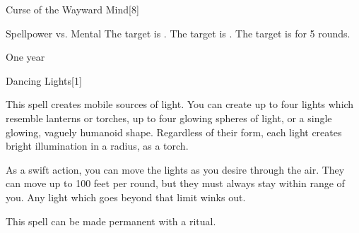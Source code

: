 \begin{spellsection}{Curse of the Wayward Mind}[8]
    \begin{spellheader}
    \end{spellheader}
    \begin{spellcontent}
        \begin{spelltargetinginfo}
        \end{spelltargetinginfo}
        \begin{spelleffects}
            \begin{spellattack}{Spellpower vs. Mental}
                \spellsuccess The target is \disoriented.
                \spellcritical The target is \confused.
                \spellfailure The target is \disoriented for 5 rounds.
            \end{spellattack}
            \spelldur One year
        \end{spelleffects}
    \end{spellcontent}
    \begin{spellfooter}
        \spellnotes \cursespellnotes
        \miscastrandom
    \end{spellfooter}
\end{spellsection}


\begin{spellsection}{Dancing Lights}[1]
    \begin{spellheader}
    \end{spellheader}
    \begin{spellcontent}
        \begin{spelltargetinginfo}
            \spellrng{\rngmed}
        \end{spelltargetinginfo}
        \begin{spelleffects}
            \spelleffect This spell creates mobile sources of light. You can create up to four lights which resemble lanterns or torches, up to four glowing spheres of light, or a single glowing, vaguely humanoid shape. Regardless of their form, each light creates bright illumination in a \areamed radius, as a torch.

            As a swift action, you can move the lights as you desire through the air. They can move up to 100 feet per round, but they must always stay within range of you. Any light which goes beyond that limit winks out.
            \spelldur \durshort \dismissable
        \end{spelleffects}
    \end{spellcontent}
    \begin{spellfooter}
        \spellnotes This spell can be made permanent with a  ritual.
        \miscastexplode
    \end{spellfooter}
\end{spellsection}

